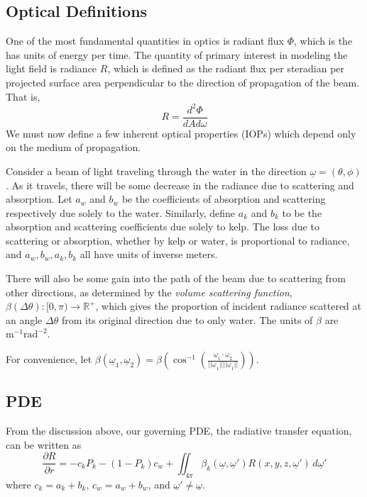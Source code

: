 \documentclass[10pt]{article}
\newcommand\R{\mathbb{R}}
\newcommand\norm[1]{||#1||}
\begin{document}
\begin{multicols}{2}
\subsection{Optical Definitions}
One of the most fundamental quantities in optics is radiant flux $\Phi$, which is the has units of energy per time.
The quantity of primary interest in modeling the light field is radiance $R$, which is defined as the radiant flux per steradian per projected surface area perpendicular to the direction of propagation of the beam.
That is,
\begin{equation}
	R = \frac{d^2\Phi}{dA d\omega}
\end{equation}
We must now define a few inherent optical properties (IOPs) which depend only on the medium of propagation.

Consider a beam of light traveling through the water in the direction $\underline{\omega} = (\theta,\phi)$.
As it travels, there will be some decrease in the radiance due to scattering and absorption.
Let $a_w$ and $b_w$ be the coefficients of absorption and scattering respectively due solely to the water.
Similarly, define $a_k$ and $b_k$ to be the absorption and scattering coefficients due solely to kelp.
The loss due to scattering or absorption, whether by kelp or water, is proportional to radiance, and $a_w,b_w,a_k,b_k$ all have units of inverse meters.

There will also be some gain into the path of the beam due to scattering from other directions, as determined by the \textit{volume scattering function},
$\displaystyle \beta(\Delta\theta): [0,\pi) \rightarrow \R^+$, which gives the proportion of incident radiance scattered at an angle $\Delta\theta$ from its original direction due to only water.
The units of $\beta$ are $\mbox{m}^{-1}\mbox{rad}^{-2}$.

For convenience, let $\displaystyle \beta(\underline{\omega}_1,\underline{\omega}_2) = \beta\left(\cos^{-1}\left(\frac{\underline{\omega}_1\cdot\underline{\omega}_2}{\norm{\underline{\omega}_1}\norm{\underline{\omega}_1}}\right)\right)$. 

\subsection{PDE}
From the discussion above, our governing PDE, the radiative transfer equation, can be written as
\begin{equation}
	\frac{\partial R}{\partial r} = 
	- c_kP_k - (1-P_k)c_w
	+ \iint_{4\pi}
	\beta_k(\underline{\omega},\underline{\omega}')
	R(x,y,z,\underline{\omega}')\,d\underline{\omega}'
	\label{eqn:rte1}
\end{equation}
where $c_k = a_k + b_k$, $c_w = a_w + b_w$, and $\underline{\omega}' \neq \underline{\omega}$.


\end{multicols}
\end{document}
